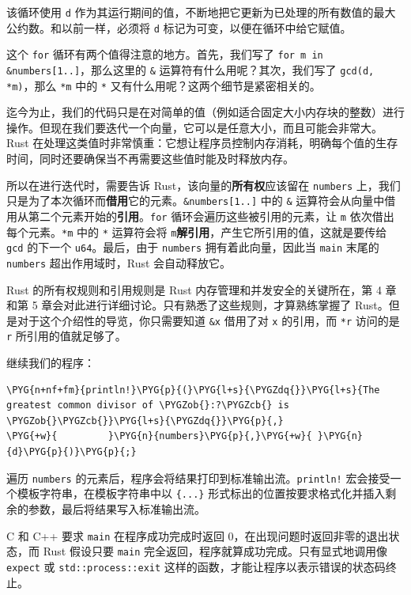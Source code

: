 该循环使用 \texttt{d} 作为其运行期间的值，不断地把它更新为已处理的所有数值的最大公约数。和以前一样，必须将 \texttt{d} 标记为可变，以便在循环中给它赋值。

这个 \texttt{for} 循环有两个值得注意的地方。首先，我们写了 \texttt{for m in \&numbers[1..]}，那么这里的 \texttt{\&} 运算符有什么用呢？其次，我们写了 \texttt{gcd(d, *m)}，那么 \texttt{*m} 中的 \texttt{*} 又有什么用呢？这两个细节是紧密相关的。

迄今为止，我们的代码只是在对简单的值（例如适合固定大小内存块的整数）进行操作。但现在我们要迭代一个向量，它可以是任意大小，而且可能会非常大。Rust 在处理这类值时非常慎重：它想让程序员控制内存消耗，明确每个值的生存时间，同时还要确保当不再需要这些值时能及时释放内存。

所以在进行迭代时，需要告诉 Rust，该向量的\textbf{所有权}应该留在 \texttt{numbers} 上，我们只是为了本次循环而\textbf{借用}它的元素。\texttt{\&numbers[1..]} 中的 \texttt{\&} 运算符会从向量中借用从第二个元素开始的\textbf{引用}。\texttt{for} 循环会遍历这些被引用的元素，让 \texttt{m} 依次借出每个元素。\texttt{*m} 中的 \texttt{*} 运算符会将 \texttt{m}\textbf{解引用}，产生它所引用的值，这就是要传给 \texttt{gcd} 的下一个 \texttt{u64}。最后，由于 \texttt{numbers} 拥有着此向量，因此当 \texttt{main} 末尾的 \texttt{numbers} 超出作用域时，Rust 会自动释放它。

Rust 的所有权规则和引用规则是 Rust 内存管理和并发安全的关键所在，第 4 章和第 5 章会对此进行详细讨论。只有熟悉了这些规则，才算熟练掌握了 Rust。但是对于这个介绍性的导览，你只需要知道 \texttt{\&x} 借用了对 \texttt{x} 的引用，而 \texttt{*r} 访问的是 \texttt{r} 所引用的值就足够了。

继续我们的程序：

\begin{Verbatim}[commandchars=\\\{\},breaklines=true,breakanywhere=true,fontsize=\codefont,xleftmargin=17bp]
\PYG{n+nf+fm}{println!}\PYG{p}{(}\PYG{l+s}{\PYGZdq{}}\PYG{l+s}{The greatest common divisor of \PYGZob{}:?\PYGZcb{} is \PYGZob{}\PYGZcb{}}\PYG{l+s}{\PYGZdq{}}\PYG{p}{,}
\PYG{+w}{         }\PYG{n}{numbers}\PYG{p}{,}\PYG{+w}{ }\PYG{n}{d}\PYG{p}{)}\PYG{p}{;}
\end{Verbatim}

遍历 \texttt{numbers} 的元素后，程序会将结果打印到标准输出流。\texttt{println!} 宏会接受一个模板字符串，在模板字符串中以 \texttt{\{...\}} 形式标出的位置按要求格式化并插入剩余的参数，最后将结果写入标准输出流。

C 和 C++ 要求 \texttt{main} 在程序成功完成时返回 0，在出现问题时返回非零的退出状态，而 Rust 假设只要 \texttt{main} 完全返回，程序就算成功完成。只有显式地调用像 \texttt{expect} 或 \texttt{std::process::exit} 这样的函数，才能让程序以表示错误的状态码终止。

